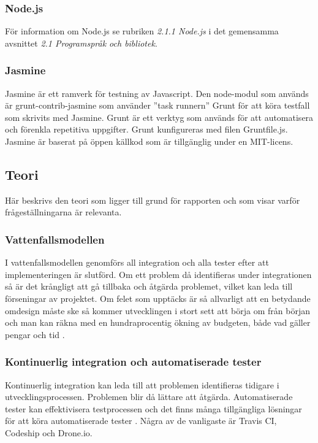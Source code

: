 \subsubsection{Node.js}
För information om Node.js se rubriken \emph{2.1.1 Node.js}
i det gemensamma avsnittet \emph{2.1 Programspråk och bibliotek}.

\subsubsection{Jasmine}
Jasmine är ett ramverk för testning av Javascript. 
Den node-modul som används är grunt-contrib-jasmine som använder ''task runnern'' Grunt 
för att köra testfall som skrivits med Jasmine. Grunt är ett verktyg som används
för att automatisera och förenkla repetitiva uppgifter.
Grunt kunfigureras med filen Gruntfile.js. Jasmine är baserat på öppen källkod
som är tillgänglig under en MIT-licens.

\subsection{Teori}
Här beskrivs den teori som ligger till grund för rapporten och som visar
varför frågeställningarna är relevanta.

\subsubsection{Vattenfallsmodellen}
I vattenfallsmodellen genomförs all integration och alla tester efter att implementeringen är slutförd. 
Om ett problem då identifieras under integrationen så är det krångligt att gå 
tillbaka och åtgärda problemet, vilket 
kan leda till förseningar av projektet.
Om felet som upptäcks är så allvarligt att en betydande omdesign måste ske så
kommer utvecklingen i stort sett att börja om från början och man kan räkna 
med en hundraprocentig ökning av budgeten, 
både vad gäller pengar och tid \cite{Royce}.

\subsubsection{Kontinuerlig integration och automatiserade tester}
Kontinuerlig integration kan leda till att problemen identifieras tidigare i 
utvecklingsprocessen. Problemen blir då lättare att åtgärda. Automatiserade tester kan effektivisera 
testprocessen och det finns många tillgängliga lösningar för att köra automatiserade
tester \cite{Karlsson}.
Några av de vanligaste är Travis CI, Codeship och Drone.io.

